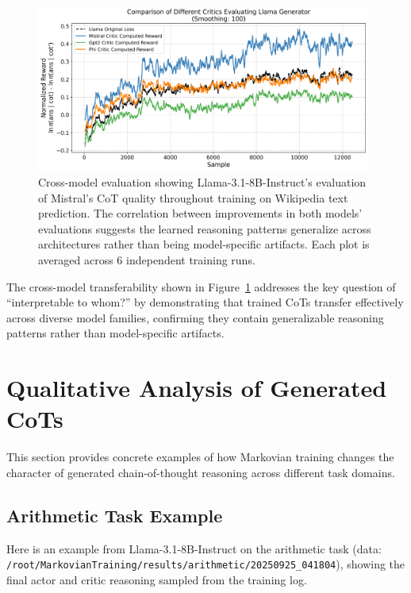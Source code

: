 \documentclass{article} %
\begin{document}
\begin{figure}[ht]
    \centering
    \includegraphics[width=0.98\textwidth]{Figures/wiki_multi_critic_comparison.png}
    \caption{Cross-model evaluation showing Llama-3.1-8B-Instruct's evaluation of Mistral's CoT quality throughout training on Wikipedia text prediction. The correlation between improvements in both models' evaluations suggests the learned reasoning patterns generalize across architectures rather than being model-specific artifacts. Each plot is averaged across 6 independent training runs.}
    \label{fig:wiki_cross_model}
\end{figure}

The cross-model transferability shown in Figure~\ref{fig:wiki_cross_model} addresses the key question of ``interpretable to whom?'' by demonstrating that trained CoTs transfer effectively across diverse model families, confirming they contain generalizable reasoning patterns rather than model-specific artifacts.

\section{Qualitative Analysis of Generated CoTs}
This section provides concrete examples of how Markovian training changes the character of generated chain-of-thought reasoning across different task domains.

\subsection{Arithmetic Task Example}
Here is an example from Llama-3.1-8B-Instruct on the arithmetic task (data: \texttt{/root/MarkovianTraining/results/arithmetic/20250925\_041804}), showing the final actor and critic reasoning sampled from the training log.
\end{document}
